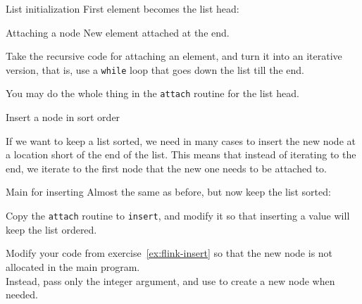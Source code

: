 \begin{slide}{List initialization}
  \label{sl:flinkinit}
  First element becomes the list head:
\end{slide}

\begin{block}{Attaching a node}
  \label{sl:flink-attach}
  New element attached at the end.
\end{block}

\begin{exercise}
  \label{ex:flist-attach-while}
  Take the recursive code for attaching an element,
  and turn it into an iterative version,
  that is, use a \lstinline{while} loop
  that goes down the list till the end.

  You may do the whole thing in the \lstinline{attach} routine
  for the list head.
\end{exercise}

 {Insert a node in sort order}

If we want to keep a list sorted, we need in many cases
to insert the new node at a location short of the end of the list.
This means that instead of iterating to the end,
we iterate to the first node that the new one needs to be attached to.

\begin{block}{Main for inserting}
  \label{sl:flink-insert-main}
  Almost the same as before,
  but now keep the list sorted:
\end{block}

\begin{exercise}
  \label{ex:flink-insert}
  Copy the \lstinline{attach} routine to \lstinline{insert},
  and modify it so that inserting a value will keep the list ordered.

\end{exercise}

\begin{exercise}
  \label{ex:flink-insert-alloc}
  Modify your code from exercise~\ref{ex:flink-insert}
  so that the new node is not allocated in the main program.\\
  Instead, pass only the integer argument,
  and use  to create a new node when needed.
\end{exercise}

